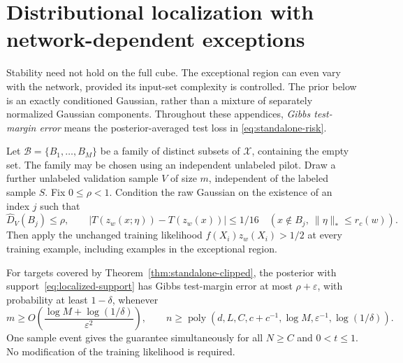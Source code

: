 \section{Distributional localization with network-dependent exceptions}
\label{sec:localized-prior-theorem}

Stability need not hold on the full cube. The exceptional region can even
vary with the network, provided its input-set complexity is controlled.
The prior below is an exactly conditioned Gaussian, rather than a mixture
of separately normalized Gaussian components. Throughout these appendices,
\emph{Gibbs test-margin error} means the posterior-averaged test loss in
\eqref{eq:standalone-risk}.

Let $\mathcal B=\{B_1,\ldots,B_M\}$ be a family of distinct subsets of
$\mathcal X$, containing the empty set. The family may be chosen using an
independent unlabeled pilot. Draw a further unlabeled validation sample
$V$ of size $m$, independent of the labeled sample $S$. Fix $0\le\rho<1$.
Condition the raw Gaussian on the existence of an index $j$ such that
\begin{equation}\label{eq:localized-support}
 \widehat D_V(B_j)\le\rho,\qquad
 |T(z_w(x;\eta))-T(z_w(x))|\le1/16
 \quad(x\notin B_j,\ \|\eta\|_*\le r_c(w)).
\end{equation}
Then apply the unchanged training likelihood $f(X_i)z_w(X_i)>1/2$ at every
training example, including examples in the exceptional region.

\begin{theorem}
\label{thm:localized-union}
For targets covered by Theorem~\ref{thm:standalone-clipped}, the posterior
with support~\eqref{eq:localized-support} has Gibbs test-margin error at
most $\rho+\varepsilon$, with probability at least $1-\delta$, whenever
\[
 m\ge O\!\left(\frac{\log M+\log(1/\delta)}{\varepsilon^2}\right),
 \qquad
 n\ge\operatorname{poly}
   (d,L,C,c+c^{-1},\log M,\varepsilon^{-1},\log(1/\delta)).
\]
One sample event gives the guarantee simultaneously for all $N\ge C$ and
$0<t\le1$. No modification of the training likelihood is required.
\end{theorem}

